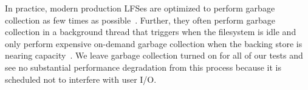 In practice, modern production LFSes are optimized to perform garbage collection
as few times as possible~\cite{F2FS}. Further, they often perform garbage
collection in a background thread that triggers when the filesystem is idle and
only perform expensive on-demand garbage collection when the backing store is
nearing capacity~\cite{F2FS, NILFS}. We leave garbage collection turned on for
all of our tests and see no substantial performance degradation from this
process because it is scheduled not to interfere with user I/O.
